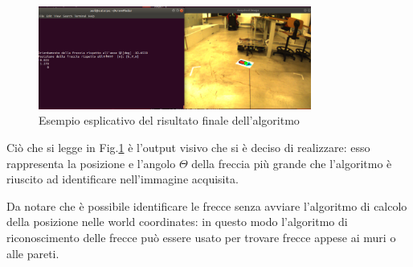 \begin{figure}[H]
	\centering
	\includegraphics[width=0.8\textwidth]{Immagini/FinalResult.png}
	\caption{Esempio esplicativo del risultato finale dell'algoritmo}
	\label{fig:finalResult}
\end{figure}

Ciò che si legge in Fig.\ref{fig:finalResult} è l'output visivo che si è deciso di realizzare:
esso rappresenta la posizione e l'angolo $\Theta$ della freccia più grande che l'algoritmo è riuscito ad identificare nell'immagine acquisita.

Da notare che è possibile identificare le frecce senza avviare l'algoritmo di calcolo della posizione nelle world coordinates: in questo modo l'algoritmo di riconoscimento delle frecce può essere usato per trovare frecce appese ai muri o alle pareti. 